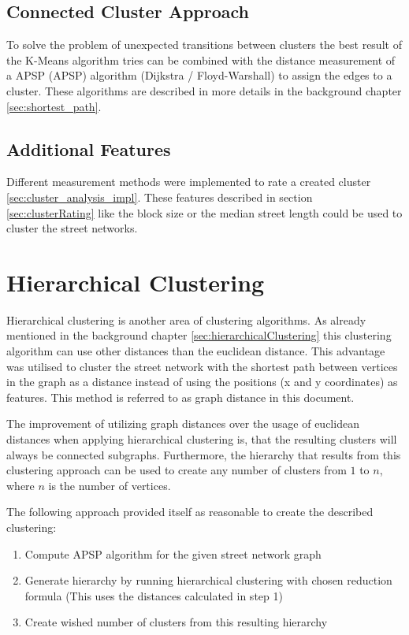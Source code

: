 \subsection{Connected Cluster Approach} \label{sec:connected_cluster_approach}
To solve the problem of unexpected transitions between clusters the best result of the K-Means algorithm tries can be combined with the distance measurement of a \acrlong{APSP} (\acrshort{APSP}) algorithm (Dijkstra / Floyd-Warshall) to assign the edges to a cluster. These algorithms are described in more details in the background chapter \ref{sec:shortest_path}.

\subsection{Additional Features}
Different measurement methods were implemented to rate a created cluster \ref{sec:cluster_analysis_impl}. These features described in section \ref{sec:clusterRating} like the block size or the median street length could be used to cluster the street networks.

\pagebreak
\section{Hierarchical Clustering}
Hierarchical clustering is another area of clustering algorithms. As already mentioned in the background chapter \ref{sec:hierarchicalClustering} this clustering algorithm can use other distances than the euclidean distance. This advantage was utilised to cluster the street network with the shortest path between vertices in the graph as a distance instead of using the positions (x and y coordinates) as features. This method is referred to as graph distance in this document.

The improvement of utilizing graph distances over the usage of euclidean distances when applying hierarchical clustering is, that the resulting clusters will always be connected subgraphs. Furthermore, the hierarchy that results from this clustering approach can be used to create any number of clusters from $1$ to $n$, where $n$ is the number of vertices.

The following approach provided itself as reasonable to create the described clustering:

\begin{enumerate}
    \item Compute \acrshort{APSP} algorithm for the given street network graph
    \item Generate hierarchy by running hierarchical clustering with chosen reduction formula (This uses the distances calculated in step 1)
    \item Create wished number of clusters from this resulting hierarchy
\end{enumerate}

